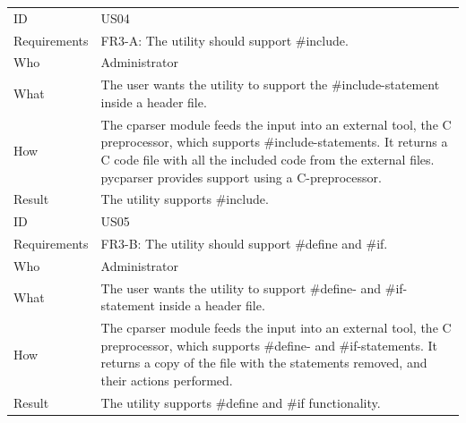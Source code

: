 \begin{table}[htbp]
{\begin{tabularx}{1.2\textwidth}{l X}
	\midrule
	ID & US04 \\
	Requirements & FR3-A: The utility should support \#include.\\
	Who & Administrator \\
	What & The user wants the utility to support the \#include-statement inside a header file.\\
	How & The cparser module feeds the input into an external tool, the C preprocessor, which supports 
		\#include-statements. It returns a C code file with all the included code from the external files. pycparser
		provides support using a C-preprocessor.  \\
	Result & The utility supports \#include. \\
	\midrule
	ID & US05 \\
	Requirements & FR3-B: The utility should support \#define and \#if. \\
	Who & Administrator \\
	What & The user wants the utility to support \#define- and \#if-statement inside a header file.\\
	How & The cparser module feeds the input into an external tool, the C preprocessor, which supports 
		\#define- and \#if-statements. It returns a copy of the file with the statements removed, and their actions performed. \\
	Result & The utility supports \#define and \#if functionality. \\
	\bottomrule
\end{tabularx}}
\end{table}

